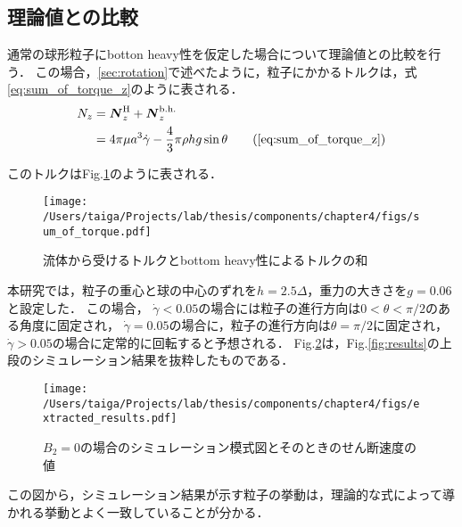 \subsection{理論値との比較}
通常の球形粒子にbotton heavy性を仮定した場合について理論値との比較を行う．
この場合，\ref{sec:rotation}で述べたように，粒子にかかるトルクは，式\eqref{eq:sum_of_torque_z}のように表される．
    \begin{align}
        N_z &= \boldsymbol{N}^\mathrm{H}_z + \boldsymbol{N}^\mathrm{b.h.}_z \notag \\
            &= 4 \pi \mu a^3 \dot{\gamma} - \frac{4}{3} \pi \rho h g \sin \theta
        \tag{\ref{eq:sum_of_torque_z}}
    \end{align}

\noindent
このトルクはFig.\ref{fig:sum_of_torque}のように表される．

    \begin{figure}[H]
        \centering
        \texttt{[image: /Users/taiga/Projects/lab/thesis/components/chapter4/figs/sum\_of\_torque.pdf]}
        \caption{流体から受けるトルクとbottom heavy性によるトルクの和}
        \label{fig:sum_of_torque}
    \end{figure}

\noindent
本研究では，粒子の重心と球の中心のずれを$h = 2.5 \Delta$，重力の大きさを$g = 0.06$と設定した．
この場合，
$\dot{\gamma} < 0.05$の場合には粒子の進行方向は$0 < \theta < \pi / 2$のある角度に固定され，
$\dot{\gamma} = 0.05$の場合に，粒子の進行方向は$\theta = \pi /2$に固定され，
$\dot{\gamma} > 0.05$の場合に定常的に回転すると予想される．
Fig.\ref{fig:extracted_results}は，Fig.\ref{fig:results}の上段のシミュレーション結果を抜粋したものである．

    \begin{figure}[htbp]
        \centering
        \texttt{[image: /Users/taiga/Projects/lab/thesis/components/chapter4/figs/extracted\_results.pdf]}
        \caption{$B_2 = 0$の場合のシミュレーション模式図とそのときのせん断速度の値}
        \label{fig:extracted_results}
    \end{figure}

\noindent
この図から，シミュレーション結果が示す粒子の挙動は，理論的な式によって導かれる挙動とよく一致していることが分かる．

